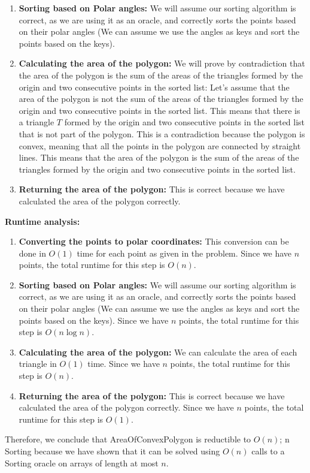 \documentclass[11pt]{article}
\begin{document}
\begin{enumerate}
\begin{enumerate}
\begin{enumerate}
\begin{enumerate}
            \item \textbf{Sorting based on Polar angles:} We will assume our sorting algorithm is correct, as we are using it as an oracle, and correctly sorts the points based on their polar angles (We can assume we use the angles as keys and sort the points based on the keys).
            \item \textbf{Calculating the area of the polygon:} We will prove by contradiction that the area of the polygon is the sum of the areas of the triangles formed by the origin and two consecutive points in the sorted list:
            \newline
            Let's assume that the area of the polygon is not the sum of the areas of the triangles formed by the origin and two consecutive points in the sorted list. This means that there is a triangle $T$ formed by the origin and two consecutive points in the sorted list that is not part of the polygon. This is a contradiction because the polygon is convex, meaning that all the points in the polygon are connected by straight lines. This means that the area of the polygon is the sum of the areas of the triangles formed by the origin and two consecutive points in the sorted list.
            \item \textbf{Returning the area of the polygon:} This is correct because we have calculated the area of the polygon correctly.
        \end{enumerate}
        \textbf{Runtime analysis:}
        \begin{enumerate}
            \item \textbf{Converting the points to polar coordinates:} This conversion can be done in $O(1)$ time for each point as given in the problem. Since we have $n$ points, the total runtime for this step is $O(n)$.
            \item \textbf{Sorting based on Polar angles:} We will assume our sorting algorithm is correct, as we are using it as an oracle, and correctly sorts the points based on their polar angles (We can assume we use the angles as keys and sort the points based on the keys). Since we have $n$ points, the total runtime for this step is $O(n\log n)$.
            \item \textbf{Calculating the area of the polygon:} We can calculate the area of each triangle in $O(1)$ time. Since we have $n$ points, the total runtime for this step is $O(n)$.
            \item \textbf{Returning the area of the polygon:} This is correct because we have calculated the area of the polygon correctly. Since we have $n$ points, the total runtime for this step is $O(1)$.
            \end{enumerate}
    \end{enumerate}
    Therefore, we conclude that AreaOfConvexPolygon is reductible to $O(n)$; n Sorting because we have shown that it can be solved using $O(n)$ calls to a Sorting oracle on arrays of length at most $n$.


\end{enumerate}
\end{enumerate}
\end{document}
